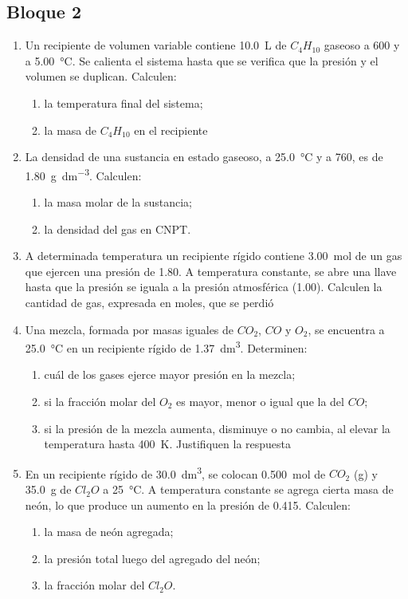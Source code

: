 \documentclass[../Práctica.root.tex]{subfiles}
\begin{document}
\subsection{Bloque 2}
\begin{enumerate}
    \item[3] Un recipiente de volumen variable contiene \SI{10,0}{\liter} de $C_4H_{10}$ gaseoso a \SI{600}{\torr} y a \SI{5,00}{\celsius}.
          Se calienta el sistema hasta que se verifica que la presión y el volumen se duplican.
          Calculen:
          \begin{enumerate}
              \item la temperatura final del sistema;
              \item la masa de $C_4H_{10}$ en el recipiente
          \end{enumerate}
    \item[11] La densidad de una sustancia en estado gaseoso, a \SI{25,0}{\celsius} y a \SI{760}{\torr}, es de
          \SI{1,80}{\g\per\dm\cubed}. Calculen:
          \begin{enumerate}
              \item la masa molar de la sustancia;
              \item la densidad del gas en CNPT.
          \end{enumerate}
    \item[12] A determinada temperatura un recipiente rígido contiene \SI{3,00}{\mole} de un gas que ejercen
          una presión de \SI{1,80}{\atm}. A temperatura constante, se abre una llave hasta que la presión se
          iguala a la presión atmosférica (\SI{1,00}{\atm}). Calculen la cantidad de gas, expresada en moles,
          que se perdió
    \item[15] Una mezcla, formada por masas iguales de $CO_2$, $CO$ y $O_2$, se encuentra a \SI{25,0}{\celsius} en un
          recipiente rígido de \SI{1,37}{\dm\cubed}. Determinen:
          \begin{enumerate}
              \item cuál de los gases ejerce mayor presión en la mezcla;
              \item si la fracción molar del $O_2$ es mayor, menor o igual que la del $CO$;
              \item si la presión de la mezcla aumenta, disminuye o no cambia, al elevar la temperatura
                    hasta \SI{400}{\kelvin}. Justifiquen la respuesta
          \end{enumerate}
    \item[17] En un recipiente rígido de \SI{30,0}{\dm\cubed}, se colocan \SI{0,500}{\mole} de $CO_2$ (g) y \SI{35,0}{\g} de $Cl_2O$ a
          \SI{25}{\celsius}. A temperatura constante se agrega cierta masa de neón, lo que produce un aumento en
          la presión de \SI{0,415}{\atm}. Calculen:
          \begin{enumerate}
              \item la masa de neón agregada;
              \item la presión total luego del agregado del neón;
              \item la fracción molar del $Cl_2O$.
          \end{enumerate}
\end{enumerate}
\end{document}
